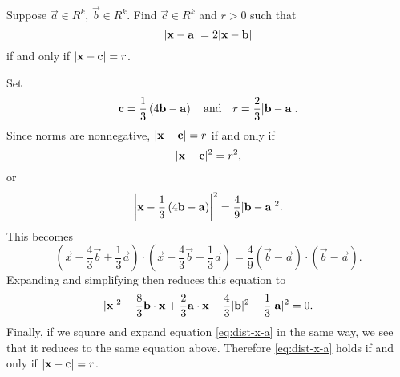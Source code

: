  Suppose $\vec{a}\in R^k$, $\vec{b}\in R^k$. Find
$\vec{c}\in R^k$ and $r > 0$ such that
\begin{equation}
  \label{eq:dist-x-a}
  \lvert{\mathbf{x}-\mathbf{a}}\rvert = 2\lvert{\mathbf{x}-\mathbf{b}}\rvert
\end{equation}
if and only if $\lvert{\mathbf{x} - \mathbf{c}}\rvert = r$.
\begin{solution}
  Set
  \begin{equation*}
    \mathbf{c} = \frac13\left(4\mathbf{b} - \mathbf{a}\right)
    \quad\text{and}\quad
    r = \frac23\lvert{\mathbf{b} - \mathbf{a}}\rvert.
  \end{equation*}
  Since norms are nonnegative, $\lvert{\mathbf{x}-\mathbf{c}}\rvert=r$ if and only
  if
  \begin{equation*}
    \lvert{\mathbf{x}-\mathbf{c}}\rvert^2 = r^2,
  \end{equation*}
  or
  \begin{equation*}
    \left\lvert{\mathbf{x} - \frac13\left(4\mathbf{b} - \mathbf{a}\right)}\right\rvert^2
    = \frac49\lvert{\mathbf{b}-\mathbf{a}}\rvert^2.
  \end{equation*}
  This becomes
  \begin{equation*}
    \left(\vec{x} - \frac43\vec{b} + \frac13\vec{a}\right)
    \cdot
    \left(\vec{x} - \frac43\vec{b} + \frac13\vec{a}\right)
    =
    \frac49(\vec{b}-\vec{a})\cdot(\vec{b}-\vec{a}).
  \end{equation*}
  Expanding and simplifying then reduces this equation to
  \begin{equation*}
    \lvert{\mathbf{x}}\rvert^2 - \frac83\mathbf{b}\cdot\mathbf{x}
    + \frac23\mathbf{a}\cdot\mathbf{x} + \frac43\lvert{\mathbf{b}}\rvert^2
    - \frac13\lvert{\mathbf{a}}\rvert^2 = 0.
  \end{equation*}
  Finally, if we square and expand equation \eqref{eq:dist-x-a} in the
  same way, we see that it reduces to the same equation
  above. Therefore \eqref{eq:dist-x-a} holds if and only if
  $\lvert{\mathbf{x}-\mathbf{c}}\rvert = r$.
\end{solution}

